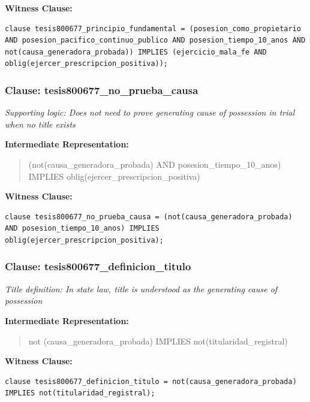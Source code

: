 \documentclass[11pt,a4paper]{article}
\begin{document}
\textbf{Witness Clause:}

\begin{lstlisting}[style=witnessstyle, language=Witness]
clause tesis800677_principio_fundamental = (posesion_como_propietario AND posesion_pacifico_continuo_publico AND posesion_tiempo_10_anos AND not(causa_generadora_probada)) IMPLIES (ejercicio_mala_fe AND oblig(ejercer_prescripcion_positiva));
\end{lstlisting}

\subsubsection{Clause: tesis800677\_no\_prueba\_causa}

\textit{Supporting logic: Does not need to prove generating cause of possession in trial when no title exists}

\textbf{Intermediate Representation:}

\begin{quote}
(not(causa\_generadora\_probada) AND posesion\_tiempo\_10\_anos) IMPLIES oblig(ejercer\_prescripcion\_positiva)
\end{quote}

\textbf{Witness Clause:}

\begin{lstlisting}[style=witnessstyle, language=Witness]
clause tesis800677_no_prueba_causa = (not(causa_generadora_probada) AND posesion_tiempo_10_anos) IMPLIES oblig(ejercer_prescripcion_positiva);
\end{lstlisting}

\subsubsection{Clause: tesis800677\_definicion\_titulo}

\textit{Title definition: In state law, title is understood as the generating cause of possession}

\textbf{Intermediate Representation:}

\begin{quote}
not (causa\_generadora\_probada) IMPLIES not(titularidad\_registral)
\end{quote}

\textbf{Witness Clause:}

\begin{lstlisting}[style=witnessstyle, language=Witness]
clause tesis800677_definicion_titulo = not(causa_generadora_probada) IMPLIES not(titularidad_registral);
\end{lstlisting}
\end{document}
